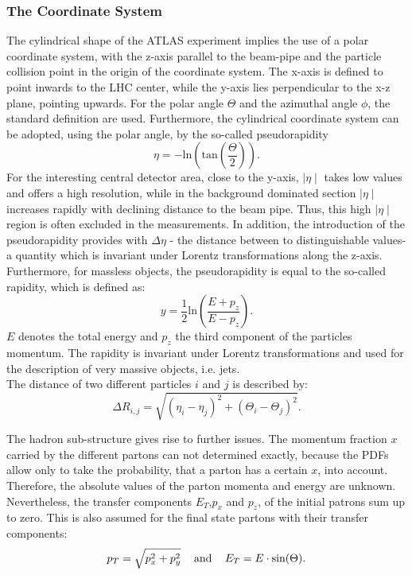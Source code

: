 \subsubsection{The Coordinate System}\label{Coordinate}
The cylindrical shape of the ATLAS experiment implies the use of a polar coordinate system, with the z-axis  parallel to the beam-pipe and the particle collision point in the origin of the coordinate system. The x-axis is defined to point inwards to the LHC center, while the y-axis lies perpendicular to the x-z plane, pointing upwards. For the polar angle $\Theta$ and the azimuthal angle $\phi$, the standard definition are used. Furthermore, the cylindrical coordinate system can be adopted, using the polar angle, by the so-called pseudorapidity
\begin{equation}\label{pseudorapidity}\eta = -\text{ln}\left(\text{tan}\left(\frac{\Theta}{2}\right)\right).
\end{equation}  
\noindent For the interesting central detector area, close to the y-axis,  $\mid\eta\mid$ takes low values and offers a high resolution, while in the background dominated section $\mid\eta\mid$ increases rapidly with declining distance to the beam pipe. Thus, this high $\mid\eta\mid$  region is often excluded in the measurements. In addition, the introduction of the pseudorapidity provides with $\Delta \eta$ - the distance between to distinguishable values- a quantity which is invariant under Lorentz transformations along the z-axis. Furthermore, for massless objects, the pseudorapidity is equal to the so-called rapidity, which is defined as:
\begin{equation}\label{rapidity}
y = \frac{1}{2}\text{ln}\left(\frac{E + p_z}{E - p_z}\right).
\end{equation}
$E$ denotes the total energy and $p_z$ the third component of the particles momentum. The rapidity is invariant under Lorentz transformations and used for the description of very massive objects, i.e.  jets.\\   


\noindent The distance of two different particles $i$ and $j$ is described by:
\begin{equation}\label{dinstance}
\Delta R_{i,j} = \sqrt{(\eta_i-\eta_j)^2+(\Theta_i-\Theta_j)^2}.
\end{equation}
   

 \noindent The hadron sub-structure gives rise to further issues. The momentum fraction $x$ carried by the different partons can not determined exactly, because the PDFs allow only to take the probability, that a parton has a certain $x$, into account. Therefore, the absolute values of the parton momenta and energy are unknown. Nevertheless, the transfer components $E_T$,$p_x$ and $p_z$, of the initial patrons sum up to zero. This is also assumed for the final state partons with their transfer components:
 \begin{equation}
 p_T = \sqrt{p_x^2+p_y^2} \text{\hspace{0.3cm} and \hspace{0.3cm}} E_T =E \cdot \text{sin}(\Theta).
 \end{equation}        





